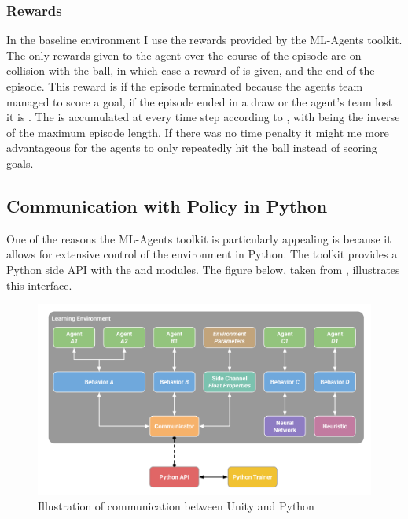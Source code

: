 \subsubsection{Rewards}\label{subsubsec:ip:environment:impl:rewards}
In the baseline environment I use the rewards provided by the ML-Agents toolkit. The only rewards given to the agent over the course of the episode are on collision with the ball, in which case a reward of  is given, and the end of the episode. This reward is  if the episode terminated because the agents team managed to score a goal, if the episode ended in a draw or the agent's team lost it is . The  is accumulated at every time step according to , with  being the inverse of the maximum episode length. If there was no time penalty it might me more advantageous for the agents to only repeatedly hit the ball instead of scoring goals.
\subsection{Communication with Policy in Python}\label{subsec:ip:environment:communication_python}
One of the reasons the ML-Agents toolkit is particularly appealing is because it allows for extensive control of the environment in Python. The toolkit provides a Python side API with the  and  modules. The figure below, taken from \cite[p. 12]{juliani2020unity}, illustrates this interface.

\begin{figure}[H]
    \centering
    \includegraphics[width=0.75\linewidth]{figures/ml_agents_python_communicator.png}
    \caption{Illustration of communication between Unity and Python}
    \label{fig:python_communicator}
\end{figure}

